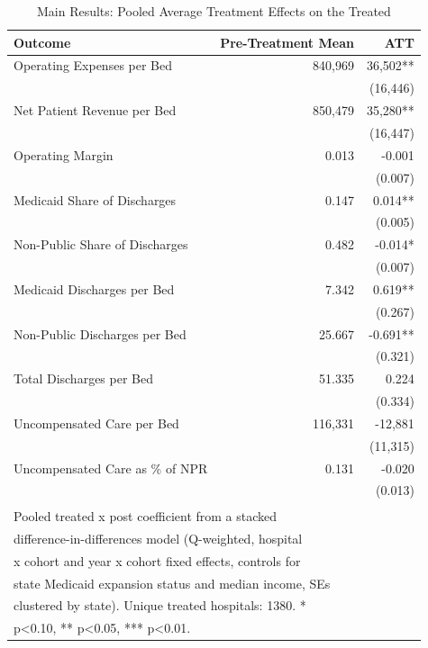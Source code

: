 \begin{table}[!h]
\centering
\caption{Main Results: Pooled Average Treatment Effects on the Treated}
\centering
\begin{tabular}[t]{lrr}
\toprule
Outcome & Pre-Treatment Mean & ATT\\
\midrule
Operating Expenses per Bed & 840,969 & 36,502**\\
 &  & (16,446)\\
Net Patient Revenue per Bed & 850,479 & 35,280**\\
 &  & (16,447)\\
Operating Margin & 0.013 & -0.001\\
\addlinespace
 &  & (0.007)\\
Medicaid Share of Discharges & 0.147 & 0.014**\\
 &  & (0.005)\\
Non-Public Share of Discharges & 0.482 & -0.014*\\
 &  & (0.007)\\
\addlinespace
Medicaid Discharges per Bed & 7.342 & 0.619**\\
 &  & (0.267)\\
Non-Public Discharges per Bed & 25.667 & -0.691**\\
 &  & (0.321)\\
Total Discharges per Bed & 51.335 & 0.224\\
\addlinespace
 &  & (0.334)\\
Uncompensated Care per Bed & 116,331 & -12,881\\
 &  & (11,315)\\
Uncompensated Care as \% of NPR & 0.131 & -0.020\\
 &  & (0.013)\\
\bottomrule
\multicolumn{3}{l}{\textsuperscript{} Pooled treated x post coefficient from a stacked}\\
\multicolumn{3}{l}{difference-in-differences model (Q-weighted, hospital}\\
\multicolumn{3}{l}{x cohort and year x cohort fixed effects, controls for}\\
\multicolumn{3}{l}{state Medicaid expansion status and median income, SEs}\\
\multicolumn{3}{l}{clustered by state). Unique treated hospitals: 1380. *}\\
\multicolumn{3}{l}{p<0.10, ** p<0.05, *** p<0.01.}\\
\end{tabular}
\end{table}
